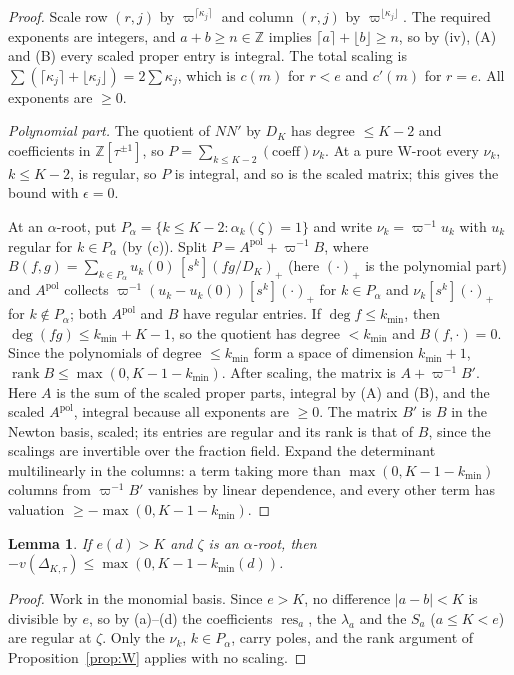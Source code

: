 \documentclass[11pt]{amsart}
\newtheorem{lemma}[theorem]{Lemma}
\theoremstyle{definition}
\theoremstyle{remark}
\numberwithin{equation}{section}
\newcommand{\ZZ}{\mathbb{Z}}
\newcommand{\Res}{\operatorname{res}}
\begin{document}
\begin{proof}
Scale row $(r,j)$ by $\varpi^{\lceil\kappa_j\rceil}$ and column $(r,j)$ by $\varpi^{\lfloor\kappa_j\rfloor}$. The
required exponents are integers, and $a+b\ge n\in\ZZ$ implies $\lceil a\rceil+\lfloor b\rfloor\ge n$, so by (iv), (A)
and (B) every scaled proper entry is integral. The total scaling is $\sum(\lceil\kappa_j\rceil+\lfloor\kappa_j\rfloor)
=2\sum\kappa_j$, which is $c(m)$ for $r<e$ and $c'(m)$ for $r=e$. All exponents are $\ge0$.

\emph{Polynomial part.} The quotient of $NN'$ by $D_K$ has degree $\le K-2$ and coefficients in $\ZZ[\tau^{\pm1}]$, so
$P=\sum_{k\le K-2}(\text{coeff})\nu_k$. At a pure W-root every $\nu_k$, $k\le K-2$, is regular, so $P$ is integral, and
so is the scaled matrix; this gives the bound with $\epsilon=0$.

At an $\alpha$-root, put $P_\alpha=\{k\le K-2:\alpha_k(\zeta)=1\}$ and write $\nu_k=\varpi^{-1}u_k$ with $u_k$ regular for
$k\in P_\alpha$ (by (c)). Split $P=A^{\mathrm{pol}}+\varpi^{-1}B$, where
$B(f,g)=\sum_{k\in P_\alpha}u_k(0)\,[s^k](fg/D_K)_+$ (here $(\cdot)_+$ is the polynomial part) and $A^{\mathrm{pol}}$
collects $\varpi^{-1}(u_k-u_k(0))[s^k](\cdot)_+$ for $k\in P_\alpha$ and $\nu_k[s^k](\cdot)_+$ for $k\notin P_\alpha$;
both $A^{\mathrm{pol}}$ and $B$ have regular entries. If $\deg f\le k_{\min}$, then $\deg(fg)\le k_{\min}+K-1$, so the
quotient has degree $<k_{\min}$ and $B(f,\cdot)=0$. Since the polynomials of degree $\le k_{\min}$ form a space of
dimension $k_{\min}+1$, $\operatorname{rank}B\le\max(0,K-1-k_{\min})$. After scaling, the matrix is $A+\varpi^{-1}B'$.
Here $A$ is the sum of the scaled proper parts, integral by (A) and (B), and the scaled $A^{\mathrm{pol}}$, integral
because all exponents are $\ge0$. The matrix $B'$ is $B$ in the Newton basis, scaled; its entries are regular and its
rank is that of $B$, since the scalings are invertible over the fraction field. Expand the determinant multilinearly in
the columns: a term taking more than $\max(0,K-1-k_{\min})$ columns from $\varpi^{-1}B'$ vanishes by linear
dependence, and every other term has valuation $\ge-\max(0,K-1-k_{\min})$.
\end{proof}

\begin{lemma}\label{lem:alpha}
If $e(d)>K$ and $\zeta$ is an $\alpha$-root, then $-v(\Delta_{K,\tau})\le\max(0,K-1-k_{\min}(d))$.
\end{lemma}
\begin{proof}
Work in the monomial basis. Since $e>K$, no difference $|a-b|<K$ is divisible by $e$, so by (a)--(d) the coefficients
$\Res_a$, the $\lambda_a$ and the $S_a$ ($a\le K<e$) are regular at $\zeta$. Only the $\nu_k$, $k\in P_\alpha$, carry
poles, and the rank argument of Proposition~\ref{prop:W} applies with no scaling.
\end{proof}
\end{document}
